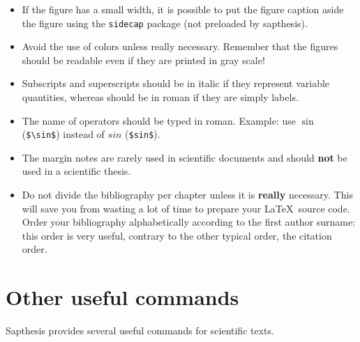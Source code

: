 \documentclass[a5paper,12pt]{article}
\newcommand{\bs}{\textbackslash}
\begin{document}
\begin{itemize}
\item If the figure has a small width, it is possible to put the figure caption
aside the figure using the \texttt{sidecap} package (not preloaded by \textsf{sapthesis}).

\item Avoid the use of colors unless really necessary. Remember that the figures should be readable even if they are printed in gray scale!

\item Subscripts and superscripts should be in italic if they represent variable quantities, whereas should be in roman if they are simply labels.

\item The name of operators should be typed in roman. Example: use $\sin$ (\texttt{\$\bs sin\$}) instead of $sin$ (\texttt{\$sin\$}).

\item The margin notes are rarely used in scientific documents and should \textbf{not} be used in a scientific thesis.

\item Do not divide the bibliography per chapter unless it is \textbf{really} necessary.
This will save you from wasting a lot of time to prepare your \LaTeX\ source code.
Order your bibliography alphabetically according to the
first author surname: this order is very useful, contrary to the other typical order, the citation order.

\end{itemize}

\clearpage
\section{Other useful commands}
\label{sec:usefulcommands}

\textsf{Sapthesis} provides several useful commands for scientific texts.
\end{document}
